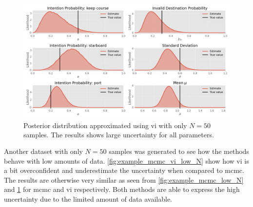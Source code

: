\begin{figure}[h]
    \centering
    \includegraphics[width=\textwidth]{figures/example_vi_low_N.png}
    \caption{Posterior distribution approximated using \acrshort{vi} with only $N=50$ samples. The results shows large uncertainty for all parameters.}
    \label{fig:example_vi_low_N}
\end{figure}



Another dataset with only $N=50$ samples was generated to see how the methods behave with low amounts of data. \cref{fig:example_mcmc_vi_low_N} show how \acrshort{vi} is a bit overconfident and underestimate the uncertainty when compared to \acrshort{mcmc}. The results are otherwise very similar as seen from \cref{fig:example_mcmc_low_N} and \cref{fig:example_vi_low_N} for \acrshort{mcmc} and \acrshort{vi} respectively. Both methods are able to express the high uncertainty due to the limited amount of data available. 

